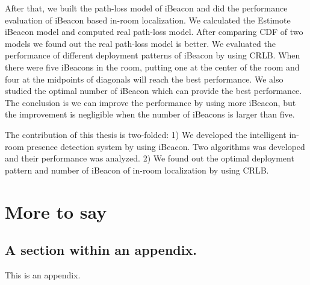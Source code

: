\documentclass[12pt]{report}
\begin{document}
After that, we built the path-loss model of iBeacon and did the performance evaluation of iBeacon based in-room localization. We calculated the Estimote iBeacon model and computed real path-loss model. After comparing CDF of two models we found out the real path-loss model is better. We evaluated the performance of different deployment patterns of iBeacon by using CRLB. When there were five iBeacons in the room, putting one at the center of the room and four at the midpoints of diagonals will reach the best performance. We also studied the optimal number of iBeacon which can provide the best performance. The conclusion is we can improve the performance by using more iBeacon, but the improvement is negligible when the number of iBeacons is larger than five.

The contribution of this thesis is two-folded: 1) We developed the intelligent in-room presence detection system by using iBeacon. Two algorithms was developed and their performance was analyzed. 2) We found out the optimal deployment pattern and number of iBeacon of in-room localization by using CRLB. 



\appendix

\chapter{More to say}

\section{A section within an appendix.}
This is an appendix.




\singlespacing

%
%
%





%

%
\end{document}
